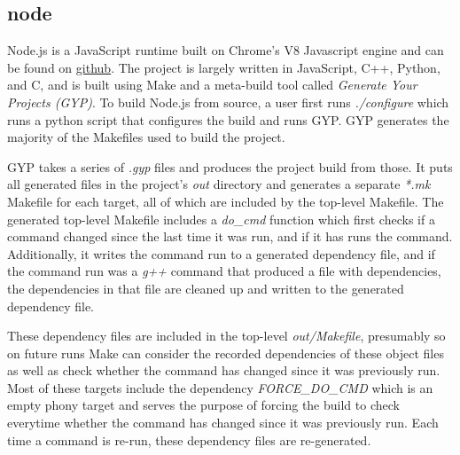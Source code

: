 

\subsection{node}
\label{sec:eval:node}


Node.js is a JavaScript runtime built on Chrome's V8 Javascript engine and can be found on \href{``https://github.com/nodejs/node''}{github}.  The project is largely written in JavaScript, C++, Python, and C, and is built using Make and a meta-build tool called \emph{Generate Your Projects (GYP)}.  To build Node.js from source, a user first runs \emph{./configure} which runs a python script that configures the build and runs GYP.  GYP generates the majority of the Makefiles used to build the project.

GYP takes a series of \emph{.gyp} files and produces the project build from those.  It puts all generated files in the project's \emph{out} directory and generates a separate \emph{*.mk} Makefile for each target, all of which are included by the top-level Makefile.  The generated top-level Makefile includes a \emph{do\_cmd} function which first checks if a command changed since the last time it was run, and if it has runs the command.  Additionally, it writes the command run to a generated dependency file, and if the command run was a \emph{g++} command that produced a file with dependencies, the dependencies in that file are cleaned up and written to the generated dependency file.

These dependency files are included in the top-level \emph{out/Makefile}, presumably so on future runs Make can consider the recorded dependencies of these object files as well as check whether the command has changed since it was previously run.  Most of these targets include the dependency \emph{FORCE\_DO\_CMD} which is an empty phony target and serves the purpose of forcing the build to check everytime whether the command has changed since it was previously run. Each time a command is re-run, these dependency files are re-generated.

